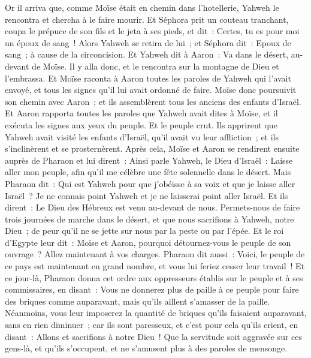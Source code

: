 \begin{multicols}{2}
Or il arriva que, comme Moïse était en chemin dans l'hotellerie, Yahweh le rencontra et chercha à le faire mourir.
Et Séphora prit un couteau tranchant, coupa le prépuce de son fils et le jeta à ses pieds, et dit~: Certes, tu es pour moi un époux de sang~!
Alors Yahweh se retira de lui~; et Séphora dit~: Epoux de sang~; à cause de la circoncision.
Et Yahweh dit à Aaron~: Va dans le désert, au-devant de Moïse. Il y alla donc, et le rencontra sur la montagne de Dieu et l'embrassa.
Et Moïse raconta à Aaron toutes les paroles de Yahweh qui l'avait envoyé, et tous les signes qu'il lui avait ordonné de faire.
Moïse donc poursuivit son chemin avec Aaron~; et ils assemblèrent tous les anciens des enfants d'Israël.
Et Aaron rapporta toutes les paroles que Yahweh avait dites à Moïse, et il exécuta les signes aux yeux du peuple.
Et le peuple crut. Ils apprirent que Yahweh avait visité les enfants d'Israël, qu'il avait vu leur affliction~; et ils s'inclinèrent et se prosternèrent.
\VerseOne{}Après cela, Moïse et Aaron se rendirent ensuite auprès de Pharaon et lui dirent~: Ainsi parle Yahweh, le Dieu d'Israël~: Laisse aller mon peuple, afin qu'il me célèbre une fête solennelle dans le désert.
Mais Pharaon dit~: Qui est Yahweh pour que j'obéisse à sa voix et que je laisse aller Israël~? Je ne connais point Yahweh et je ne laisserai point aller Israël.
Et ils dirent~: Le Dieu des Hébreux est venu au-devant de nous. Permets-nous de faire trois journées de marche dans le désert, et que nous sacrifions à Yahweh, notre Dieu~; de peur qu'il ne se jette sur nous par la peste ou par l'épée.
Et le roi d'Egypte leur dit~: Moïse et Aaron, pourquoi détournez-vous le peuple de son ouvrage~? Allez maintenant à vos charges.
Pharaon dit aussi~: Voici, le peuple de ce pays est maintenant en grand nombre, et vous lui feriez cesser leur travail~!
Et ce jour-là, Pharaon donna cet ordre aux oppresseurs établis sur le peuple et à ses commissaires, en disant~:
Vous ne donnerez plus de paille à ce peuple pour faire des briques comme auparavant, mais qu'ils aillent s'amasser de la paille.
Néanmoins, vous leur imposerez la quantité de briques qu'ils faisaient auparavant, sans en rien diminuer~; car ils sont paresseux, et c'est pour cela qu'ils crient, en disant~: Allons et sacrifions à notre Dieu~!
Que la servitude soit aggravée sur ces gens-là, et qu'ils s'occupent, et ne s'amusent plus à des paroles de mensonge.

\end{multicols}

